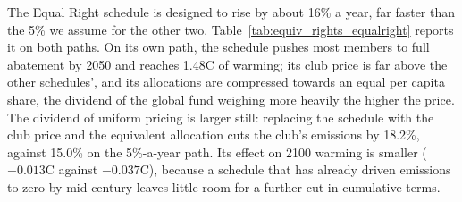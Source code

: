 \documentclass[12pt,english]{article}
\theoremstyle{remark}
\begin{document}
The Equal Right schedule is designed to rise by about 16\% a year, far faster than the 5\% we assume for the other two. Table~\ref{tab:equiv_rights_equalright} reports it on both paths. On its own path, the schedule pushes most members to full abatement by 2050 and reaches 1.48\textdegree C of warming; its club price is far above the other schedules', and its allocations are compressed towards an equal per capita share, the dividend of the global fund weighing more heavily the higher the price. The dividend of uniform pricing is larger still: replacing the schedule with the club price and the equivalent allocation cuts the club's emissions by 18.2\%, against 15.0\% on the 5\%-a-year path. Its effect on 2100 warming is smaller ($-0.013$\textdegree C against $-0.037$\textdegree C), because a schedule that has already driven emissions to zero by mid-century leaves little room for a further cut in cumulative terms.

\end{document}
